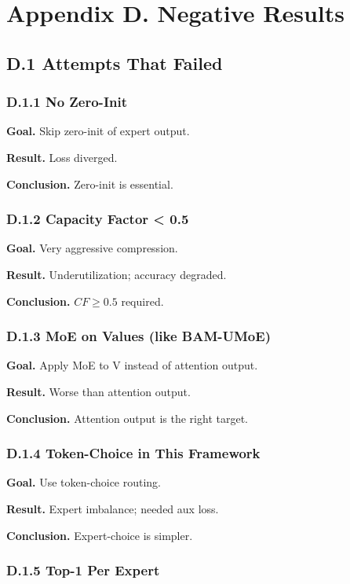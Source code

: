 \section{Appendix D. Negative Results}

\subsection{D.1 Attempts That Failed}

\subsubsection{D.1.1 No Zero-Init}

\textbf{Goal.} Skip zero-init of expert output.

\textbf{Result.} Loss diverged.

\textbf{Conclusion.} Zero-init is essential.

\subsubsection{D.1.2 Capacity Factor < 0.5}

\textbf{Goal.} Very aggressive compression.

\textbf{Result.} Underutilization; accuracy degraded.

\textbf{Conclusion.} $CF \geq 0.5$ required.

\subsubsection{D.1.3 MoE on Values (like BAM-UMoE)}

\textbf{Goal.} Apply MoE to V instead of attention output.

\textbf{Result.} Worse than attention output.

\textbf{Conclusion.} Attention output is the right target.

\subsubsection{D.1.4 Token-Choice in This Framework}

\textbf{Goal.} Use token-choice routing.

\textbf{Result.} Expert imbalance; needed aux loss.

\textbf{Conclusion.} Expert-choice is simpler.

\subsubsection{D.1.5 Top-1 Per Expert}

